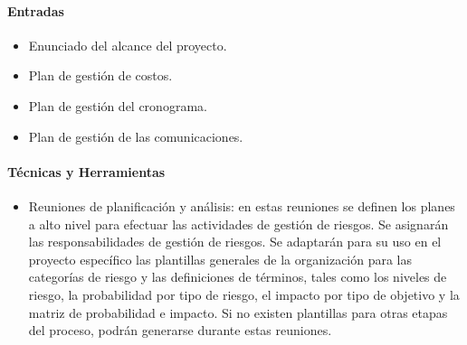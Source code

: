 \documentclass[a4paper,twosides]{article}
\newlength{\wideitemsep}
\let\olditem\item
\renewcommand{\item}{\setlength{\itemsep}{\wideitemsep}\olditem}
\begin{document}
\paragraph{Entradas}
\begin{itemize}
\item Enunciado del alcance del proyecto.
\item Plan de gestión de costos.
\item Plan de gestión del cronograma.
\item Plan de gestión de las comunicaciones.
\end{itemize}

\paragraph{Técnicas y Herramientas}
\begin{itemize}
\item Reuniones de planificación y análisis: en estas reuniones se definen los planes a alto nivel para efectuar las actividades de gestión de riesgos. Se asignarán las responsabilidades de
gestión de riesgos. Se adaptarán para su uso en el proyecto específico las plantillas generales de la organización para las categorías de riesgo y las definiciones de términos, tales como los niveles de riesgo, la probabilidad por tipo de riesgo, el impacto por tipo de objetivo y la matriz de probabilidad e impacto. Si no existen plantillas para otras etapas del proceso, podrán generarse durante estas reuniones.
\end{itemize}
\end{document}
